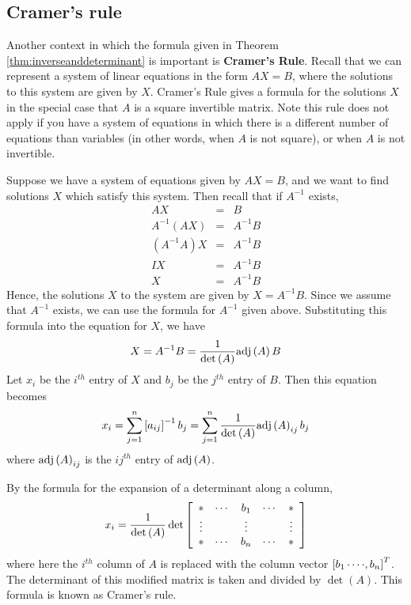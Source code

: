 \subsection{Cramer's rule}

Another context in which the formula given in Theorem
\ref{thm:inverseanddeterminant} is important is \textbf{Cramer's
Rule}.  Recall that we can represent a system of linear equations in
the form $AX=B$, where the solutions to this system are given by $X$.
Cramer's Rule gives a formula for the solutions $X$ in the special
case that $A$ is a square invertible matrix. Note this rule does not
apply if you have a system of equations in which there is a different
number of equations than variables (in other words, when $A$ is not
square), or when $A$ is not invertible.

Suppose we have a system of equations given by $AX=B$, and we want to find solutions $X$ which satisfy 
this system.
Then recall that if $A^{-1}$ exists,
\begin{eqnarray*}
AX&=&B \\
A^{-1}\left(AX\right)&=&A^{-1}B \\
\left(A^{-1}A\right)X&=&A^{-1}B \\
IX&=&A^{-1}B\\
X &=& A^{-1}B
\end{eqnarray*}
Hence, the solutions $X$ to the system are given by $X=A^{-1}B$. 
Since we assume that $A^{-1}$ exists, we can use the
formula for $A^{-1}$ given above. Substituting this formula into the equation for $X$, we have 
\begin{equation*}
X=A^{-1}B=\frac{1}{\det \left( A\right) }\mbox{adj}\left( A\right)B
\end{equation*}
Let $x_i$ be the $i^{th}$ entry of $X$ and $b_j$ be the $j^{th}$ entry of $B$.
Then this equation becomes
\begin{equation*}
x_i = \sum_{j=1}^{n}\leftB a_{ij}\rightB^{-1}b_{j}=\sum_{j=1}^{n}\vspace{0.05in}\frac{1}
{\det \left( A\right) } \func{adj}\left( A\right) _{ij}b_{j}
\end{equation*}
where $\mbox{adj}\left(A\right)_{ij}$ is the $ij^{th}$ entry of $\mbox{adj}\left(A\right)$.

By the formula for the expansion of a determinant along a column,
\begin{equation*}
x_{i}=\vspace{0.05in}\frac{1}{\det \left( A\right) }\det \leftB
\begin{array}{ccccc}
\ast & \cdots & b_{1} & \cdots & \ast \\
\vdots &  & \vdots &  & \vdots \\
\ast & \cdots & b_{n} & \cdots & \ast
\end{array}
\rightB 
\end{equation*}
where here the $i^{th}$ column of $A$ is replaced with the column vector 
$\left[ b_{1}\cdots \cdot ,b_{n}\right] ^{T}$. The determinant of this
modified matrix is taken and divided by $\det \left( A\right) $. This
formula is known as Cramer's rule.

